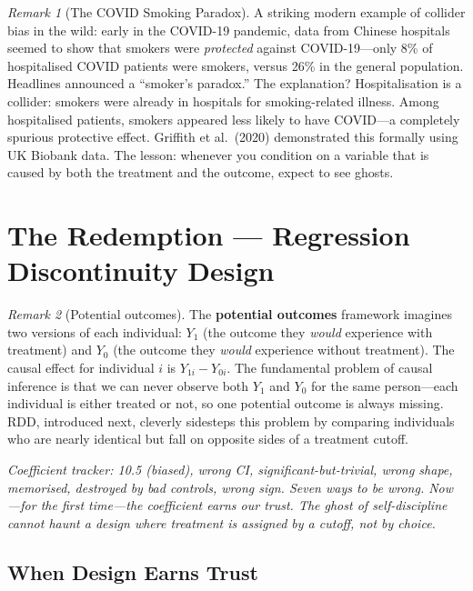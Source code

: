 \documentclass[11pt,a4paper]{article}
\theoremstyle{definition}
\theoremstyle{plain}
\theoremstyle{remark}
\newtheorem{remark}{Remark}[section]
\begin{document}
\begin{remark}[The COVID Smoking Paradox]
A striking modern example of collider bias in the wild: early in the COVID-19 pandemic, data from Chinese hospitals seemed to show that smokers were \emph{protected} against COVID-19---only 8\% of hospitalised COVID patients were smokers, versus 26\% in the general population. Headlines announced a ``smoker's paradox.'' The explanation? Hospitalisation is a collider: smokers were already in hospitals for smoking-related illness. Among hospitalised patients, smokers appeared less likely to have COVID---a completely spurious protective effect. Griffith et al.\ (2020) demonstrated this formally using UK Biobank data. The lesson: whenever you condition on a variable that is caused by both the treatment and the outcome, expect to see ghosts.
\end{remark}

\section{The Redemption --- Regression Discontinuity Design}\label{sec:rdd}

\begin{remark}[Potential outcomes]
The \textbf{potential outcomes} framework imagines two versions of each individual: $Y_1$ (the outcome they \emph{would} experience with treatment) and $Y_0$ (the outcome they \emph{would} experience without treatment). The causal effect for individual $i$ is $Y_{1i} - Y_{0i}$. The fundamental problem of causal inference is that we can never observe both $Y_1$ and $Y_0$ for the same person---each individual is either treated or not, so one potential outcome is always missing. RDD, introduced next, cleverly sidesteps this problem by comparing individuals who are nearly identical but fall on opposite sides of a treatment cutoff.
\end{remark}


\noindent\textit{Coefficient tracker: 10.5 (biased), wrong CI, significant-but-trivial, wrong shape, memorised, destroyed by bad controls, wrong sign. Seven ways to be wrong. Now---for the first time---the coefficient earns our trust. The ghost of self-discipline cannot haunt a design where treatment is assigned by a cutoff, not by choice.}

\subsection{When Design Earns Trust}
\end{document}
